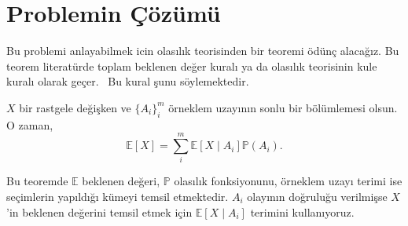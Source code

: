 \section{Problemin \c{C}\"{o}z\"{u}m\"{u}}
\label{sec:solution}

Bu problemi anlayabilmek icin olas{\i}l{\i}k teorisinden bir teoremi
\"{o}d\"{u}n\c{c} alaca\u{g}{\i}z. Bu teorem literat\"{u}rde toplam beklenen
de\u{g}er kural{\i} ya da olas{\i}l{\i}k teorisinin kule kural{\i} olarak
ge\c{c}er.~\cite{bertsekas2002introduction} Bu kural \c{s}unu s\"{o}ylemektedir.

\begin{thm} \label{thm:kule}
    $X$ bir rastgele de\u{g}i\c{s}ken ve $\{A_i\}_i^m$ \"{o}rneklem
    uzay{\i}n{\i}n sonlu bir b\"{o}l\"{u}mlemesi olsun. O zaman, 
    \[ \mathbb{E}[X] = \sum_i^m \mathbb{E}\left[ X \mid A_i \right]
    \mathbb{P}(A_i). \]
\end{thm}
%
\noindent Bu teoremde $\mathbb{E}$ beklenen de\u{g}eri, $\mathbb{P}$
olas{\i}l{\i}k fonksiyonunu, \"{o}rneklem uzay{\i} terimi ise se\c{c}imlerin
yap{\i}ld{\i}\u{g}{\i} k\"{u}meyi temsil etmektedir. $A_i$ olay{\i}n{\i}n
do\u{g}rulu\u{g}u verilmi\c{s}se $X$'in beklenen de\u{g}erini temsil etmek
i\c{c}in $\mathbb{E}\left[ X \mid A_i \right]$ terimini kullan{\i}yoruz.

